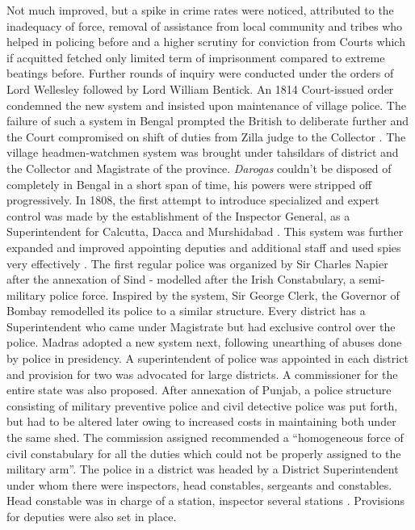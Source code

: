 \documentclass[a4paper]{article}
\begin{document}
Not much improved\cite[p. 9]{india1913history}, but a spike in
crime rates were noticed, attributed to the inadequacy of force,
removal of assistance from local community and tribes who helped
in policing before and a higher scrutiny for conviction from
Courts which if acquitted fetched only limited term of
imprisonment compared to extreme beatings before. Further rounds
of inquiry were conducted under the orders of Lord Wellesley
followed by Lord William Bentick. An 1814 Court-issued order
condemned the new system and insisted upon maintenance of
village police. The failure of such a system in Bengal prompted
the British to deliberate further and the Court compromised on
shift of duties from Zilla judge to the Collector \cite[p.
11]{india1913history}. The village headmen-watchmen system was
brought under tahsildars of district and the Collector and
Magistrate of the province.  \emph{Darogas} couldn't be disposed
of completely in Bengal in a short span of time, his powers were
stripped off progressively.  In 1808, the first attempt to
introduce specialized and expert control was made by the
establishment of the Inspector General, as a Superintendent for
Calcutta, Dacca and Murshidabad \cite[p.  12]{india1913history}.
This system was further expanded and improved appointing
deputies and additional staff and used spies very effectively
\cite[p. 12]{india1913history}. The first regular police was
organized by Sir Charles Napier after the annexation of Sind -
modelled after the Irish Constabulary, a semi-military police
force. Inspired by the system, Sir George Clerk, the Governor of
Bombay remodelled its police to a similar structure. Every
district has a Superintendent who came under Magistrate but had
exclusive control over the police\cite[p. 14]{india1913history}.
Madras adopted a new system next, following unearthing of abuses
done by police in presidency\cite[p. 14]{india1913history}. A
superintendent of police was appointed in each district and
provision for two was advocated for large districts. A
commissioner for the entire state was also proposed. After
annexation of Punjab, a police structure consisting of military
preventive police and civil detective police was put forth, but
had to be altered later owing to increased costs in maintaining
both under the same shed. The commission assigned recommended a
``homogeneous force of civil constabulary for all the duties
which could not be properly assigned to the military
arm''\cite[p. 16]{india1913history}. The police in a district
was headed by a District Superintendent under whom there were
inspectors, head constables, sergeants and constables. Head
constable was in charge of a station, inspector several
stations \cite[p. 16]{india1913history}. Provisions for deputies
were also set in place.
\end{document}
